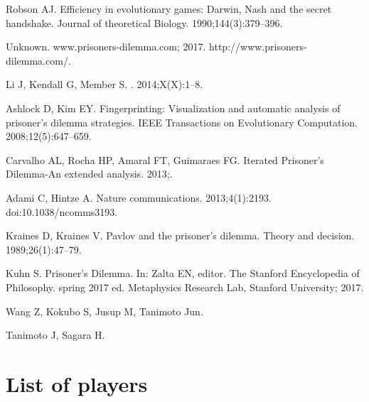 \documentclass[10pt,letterpaper]{article}
\begin{document}
\begin{thebibliography}{10}
Robson AJ.
\newblock Efficiency in evolutionary games: Darwin, Nash and the secret
  handshake.
\newblock Journal of theoretical Biology. 1990;144(3):379--396.

Unknown. www.prisoners-dilemma.com; 2017.
\newblock http://www.prisoners-dilemma.com/.

Li J, Kendall G, Member S.
. 2014;X(X):1--8.

Ashlock D, Kim EY.
\newblock Fingerprinting: Visualization and automatic analysis of prisoner's
  dilemma strategies.
\newblock IEEE Transactions on Evolutionary Computation. 2008;12(5):647--659.

Carvalho AL, Rocha HP, Amaral FT, Guimaraes FG.
\newblock Iterated Prisoner’s Dilemma-An extended analysis. 2013;.

Adami C, Hintze A.
\newblock Nature communications. 2013;4(1):2193.
\newblock doi:{10.1038/ncomms3193}.

Kraines D, Kraines V.
\newblock Pavlov and the prisoner's dilemma.
\newblock Theory and decision. 1989;26(1):47--79.

Kuhn S.
\newblock Prisoner's Dilemma.
\newblock In: Zalta EN, editor. The Stanford Encyclopedia of Philosophy. spring
  2017 ed. Metaphysics Research Lab, Stanford University; 2017.

Wang Z, Kokubo S, Jusup M, Tanimoto Jun.

Tanimoto J, Sagara H.

\end{thebibliography}

\appendix

\section{List of players}\label{app:list_of_players}
\end{document}

